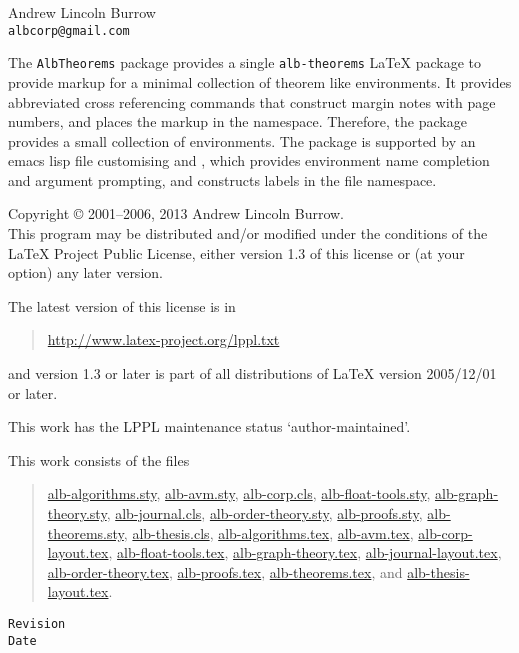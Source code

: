 \documentclass[11pt,a4paper,oneside,titlepage]{alb-corp}
\begin{document}


\begin{albTitlePage}


  Andrew Lincoln Burrow\\
  \texttt{albcorp@gmail.com}



  The \texttt{AlbTheorems} package provides a single
  \texttt{alb-theorems} \LaTeX{} package to provide markup for a minimal
  collection of theorem like environments.  It provides abbreviated
  cross referencing commands that construct margin notes with page
  numbers, and places the markup in the \albLogo{} namespace.
  Therefore, the package provides a small collection of environments.
  The package is supported by an emacs lisp file customising \AUCTeX{}
  and \RefTeX{}, which provides environment name completion and argument
  prompting, and constructs labels in the file namespace.



  Copyright \copyright{} 2001--2006, 2013 Andrew Lincoln Burrow.\\
  This program may be distributed and/or modified under the conditions
  of the \LaTeX{} Project Public License, either version 1.3 of this
  license or (at your option) any later version.

  \medskip{}

  The latest version of this license is in
  \begin{quote}
    \url{http://www.latex-project.org/lppl.txt}
  \end{quote}
  and version 1.3 or later is part of all distributions of LaTeX version
  2005/12/01 or later.

  \medskip{}

  This work has the LPPL maintenance status `author-maintained'.

  \medskip{}

  This work consists of the files
  \begin{quote}
    \begin{flushleft}
      \url{alb-algorithms.sty}, \url{alb-avm.sty}, \url{alb-corp.cls},
      \url{alb-float-tools.sty}, \url{alb-graph-theory.sty},
      \url{alb-journal.cls}, \url{alb-order-theory.sty},
      \url{alb-proofs.sty}, \url{alb-theorems.sty},
      \url{alb-thesis.cls}, \url{alb-algorithms.tex}, \url{alb-avm.tex},
      \url{alb-corp-layout.tex}, \url{alb-float-tools.tex},
      \url{alb-graph-theory.tex}, \url{alb-journal-layout.tex},
      \url{alb-order-theory.tex}, \url{alb-proofs.tex},
      \url{alb-theorems.tex}, and \url{alb-thesis-layout.tex}.
    \end{flushleft}
  \end{quote}



  \verb$Revision$\\
  \verb$Date$

\end{albTitlePage}
\end{document}
